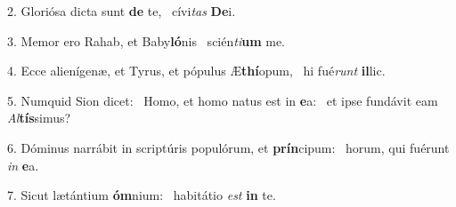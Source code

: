 2. Gloriósa dicta sunt \textbf{de} te, \ast\  cívi\textit{tas} \textbf{De}i.\

3. Memor ero Rahab, et Baby\textbf{ló}nis \ast\  scién\textit{ti}\textbf{um} me.\

4. Ecce alienígenæ, et Tyrus, et pópulus Æ\textbf{thí}opum, \ast\  hi fué\textit{runt} \textbf{il}lic.\

5. Numquid Sion dicet: \dag\  Homo, et homo natus est in \textbf{e}a: \ast\  et ipse fundávit eam \textit{Al}\textbf{tís}simus?\

6. Dóminus narrábit in scriptúris populórum, et \textbf{prín}cipum: \ast\  horum, qui fuérunt \textit{in} \textbf{e}a.\

7. Sicut lætántium \textbf{óm}nium: \ast\  habitátio \textit{est} \textbf{in} te.\

